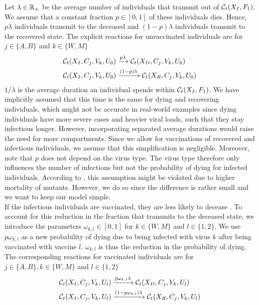 Let $\lambda \in \mathbb{R}_+$ be the average number of individuals that transmit out of $\mathcal{C}_t(X_I, F_1)$. We assume that a constant fraction $p \in [0,1]$ of these individuals dies. Hence, $p\lambda$ individuals transmit to the deceased and $(1-p)\lambda$ individuals transmit to the recovered state. 
The explicit reactions for unvaccinated individuals are for $j \in \{A, B\}$ and $k \in \{W, M\}$
\begin{align}
    \mathcal{C}_t(X_I, C_j, V_k, U_0) &\xrightarrow{p \lambda} \mathcal{C}_t(X_D,C_j, V_k, U_0)  \\
    \mathcal{C}_t(X_I, C_j, V_k, U_0) &\xrightarrow{(1-p) \lambda} \mathcal{C}_t(X_R,C_j, V_k, U_0) \notag
\end{align}
$1/\lambda$ is the average duration an individual spends within $\mathcal{C}_t(X_I, F_1)$. We have implicitly assumed that this time is the same for dying and recovering individuals, which might not be accurate in real-world examples since dying individuals have more severe cases and heavier viral loads, such that they stay infectious longer. However, incorporating separated average durations would raise the need for more compartments. Since we allow for vaccinations of recovered and infectious individuals, we assume that this simplification is negligible. Moreover, note that $p$ does not depend on the virus type. The virus type therefore only influences the number of infections but not the probability of dying for infected individuals. According to \cite{Davies.2021}, this assumption might be violated due to higher mortality of mutants. However, we do so since the difference is rather small and we want to keep our model simple. \\


If the infectious individuals are vaccinated, they are less likely to decease \citep{Tenforde.2021, Voysey.2021}. To account for this reduction in the fraction that transmits to the deceased state, we introduce the parameters $\omega_{k,l} \in [0,1]$ for $k \in \{W, M\}$ and $l \in \{1,2\}$. We use $p \omega_{k,l}$ as a new probability of dying due to being infected with virus $k$ after being vaccinated with vaccine $l$. $\omega_{k,l}$ is thus the reduction in the probability of dying. The corresponding reactions for vaccinated individuals are for $j \in \{A, B\}, k \in \{W, M\}$ and $l \in \{1,2\}$
\begin{align}
    \mathcal{C}_t(X_I, C_j, V_k, U_l) &\xrightarrow{p \omega_{k,l} \lambda} \mathcal{C}_t(X_D,C_j, V_k, U_l) \\
    \mathcal{C}_t(X_I, C_j, V_k, U_l) &\xrightarrow{(1-p \omega_{k,l}) \lambda} \mathcal{C}_t(X_R,C_j, V_k, U_l) \notag
\end{align}

